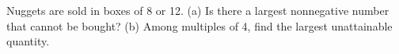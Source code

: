 Nuggets are sold in boxes of 8 or 12. (a) Is there a largest nonnegative number that cannot be bought? (b) Among multiples of 4, find the largest unattainable quantity.
